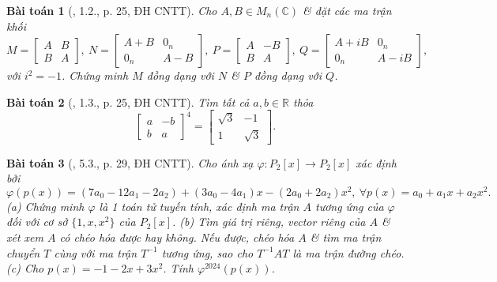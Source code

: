 \documentclass{article}
\newtheorem{baitoan}{Bài toán}
\begin{document}
\begin{baitoan}[\cite{VMS_VMC2024}, 1.2., p. 25, ĐH CNTT]
	Cho $A,B\in M_n(\mathbb{C})$ \& đặt các ma trận khối
	\begin{equation*}
		M = \begin{bmatrix}
			A & B\\B & A
		\end{bmatrix},\ N = \begin{bmatrix}
			A + B & 0_n\\0_n & A - B
		\end{bmatrix},\ P = \begin{bmatrix}
			A & -B\\B & A
		\end{bmatrix},\ Q = \begin{bmatrix}
			A + iB & 0_n\\0_n & A - iB
		\end{bmatrix},
	\end{equation*}
	với $i^2 = -1$. Chứng minh $M$ đồng dạng với $N$ \& $P$ đồng dạng với $Q$.
\end{baitoan}

\begin{baitoan}[\cite{VMS_VMC2024}, 1.3., p. 25, ĐH CNTT]
	Tìm tất cả $a,b\in\mathbb{R}$ thỏa
	\begin{equation*}
		\begin{bmatrix}
			a & -b\\b & a
		\end{bmatrix}^4 = \begin{bmatrix}
			\sqrt{3} & -1\\1 & \sqrt{3}
		\end{bmatrix}.
	\end{equation*}
\end{baitoan}

\begin{baitoan}[\cite{VMS_VMC2024}, 5.3., p. 29, ĐH CNTT]
	Cho ánh xạ $\varphi:P_2[x]\to P_2[x]$ xác định bởi
	\begin{equation*}
		\varphi(p(x)) = (7a_0 - 12a_1 - 2a_2) + (3a_0 - 4a_1)x - (2a_0 + 2a_2)x^2,\ \forall p(x) = a_0 + a_1x + a_2x^2.
	\end{equation*}
	(a) Chứng minh $\varphi$ là 1 toán tử tuyến tính, xác định ma trận $A$ tương ứng của $\varphi$ đối với cơ sở $\{1,x,x^2\}$ của $P_2[x]$. (b) Tìm giá trị riêng, vector riêng của $A$ \& xét xem $A$ có chéo hóa được hay không. Nếu được, chéo hóa $A$ \& tìm ma trận chuyển $T$ cùng với ma trận $T^{-1}$ tương ứng, sao cho $T^{-1}AT$ là ma trận đường chéo. (c) Cho $p(x) = -1 - 2x + 3x^2$. Tính $\varphi^{2024}(p(x))$.
\end{baitoan}
\end{document}
